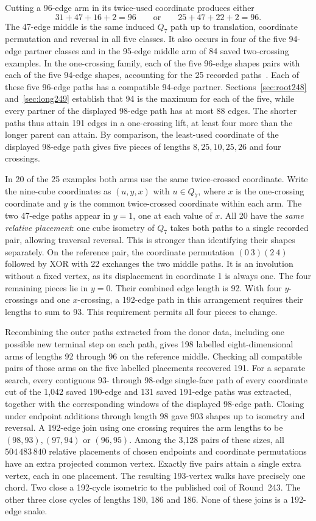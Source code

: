 \documentclass[11pt,a4paper]{article}
\theoremstyle{definition}
\theoremstyle{remark}
\begin{document}
Cutting a 96-edge arm in its twice-used coordinate produces either
\[
 31+47+16+2=96 \qquad\text{or}\qquad 25+47+22+2=96.
\]
The 47-edge middle is the same induced $Q_7$ path up to translation,
coordinate permutation and reversal in all five classes. It also occurs
in four of the five 94-edge partner classes and in the 95-edge middle
arm of 84 saved two-crossing examples. In the one-crossing family,
each of the five 96-edge shapes pairs with each of the five 94-edge
shapes, accounting for the 25 recorded paths~\cite{q8parents246}.
Each of these five 96-edge paths has a compatible 94-edge partner.
Sections~\ref{sec:root248} and~\ref{sec:long249} establish that 94 is
the maximum for each of the five, while every partner of the displayed
98-edge path has at most 88 edges. The shorter paths thus attain 191
edges in a one-crossing lift, at least four more than the longer
parent can attain.
By comparison, the least-used coordinate of the displayed 98-edge
path gives five pieces of lengths $8,25,10,25,26$ and four crossings.

In 20 of the 25 examples both arms use the same twice-crossed
coordinate. Write the nine-cube coordinates as $(u,y,x)$ with
$u\in Q_7$, where $x$ is the one-crossing coordinate and $y$ is
the common twice-crossed coordinate within each arm. The two 47-edge
paths appear in $y=1$, one at each value of $x$. All 20 have the
\emph{same relative placement}: one cube isometry of $Q_7$ takes
both paths to a single recorded pair, allowing traversal reversal.
This is stronger than identifying their shapes separately. On the
reference pair, the coordinate permutation $(0\ 3)(2\ 4)$ followed
by XOR with 22 exchanges the two middle paths. It is an involution
without a fixed vertex, as its displacement in coordinate 1 is always
one. The four remaining pieces lie in $y=0$. Their combined edge
length is 92. With four $y$-crossings and one $x$-crossing, a
192-edge path in this arrangement requires their lengths to sum to 93.
This requirement permits all four pieces to change.

Recombining the outer paths extracted from the donor data, including
one possible new terminal step on each path, gives 198 labelled
eight-dimensional arms of lengths 92 through 96 on the reference
middle. Checking all compatible pairs of those arms on the five labelled
placements recovered 191. For a separate search, every contiguous
93- through 98-edge single-face path of every coordinate cut of
the 1,042 saved 190-edge and 131 saved 191-edge paths was extracted,
together with the corresponding windows of the displayed 98-edge
path. Closing under endpoint additions through length 98 gave 903
shapes up to isometry and reversal. A 192-edge join using one crossing
requires the arm lengths to be $(98,93),(97,94)$ or $(96,95)$.
Among the 3,128 pairs of these sizes, all $504\,483\,840$ relative
placements of chosen endpoints and coordinate permutations have
an extra projected common vertex. Exactly five pairs attain a single
extra vertex, each in one placement. The resulting 193-vertex walks
have precisely one chord. Two close a 192-cycle isometric to the
published coil of Round~243. The other three close cycles of lengths
180, 186 and 186. None of these joins is a 192-edge snake.
\end{document}
